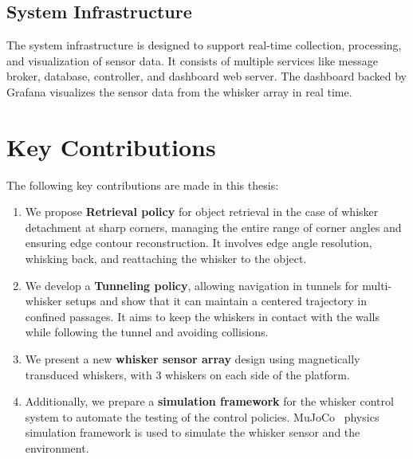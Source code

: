 \subsection{System Infrastructure}
The system infrastructure is designed to support real-time collection, processing, and visualization of sensor data.
It consists of multiple services like message broker, database, controller, and dashboard web server.
The dashboard backed by Grafana visualizes the sensor data from the whisker array in real time.


\section{Key Contributions}
The following key contributions are made in this thesis:
\begin{enumerate}
    \item We propose \textbf{Retrieval policy} for object retrieval in the case of whisker detachment at sharp corners, managing the entire range of corner angles and ensuring edge contour reconstruction.
    It involves edge angle resolution, whisking back, and reattaching the whisker to the object.
    \item We develop a \textbf{Tunneling policy}, allowing navigation in tunnels for multi-whisker setups and show that it can maintain a centered trajectory in confined passages.
    It aims to keep the whiskers in contact with the walls while following the tunnel and avoiding collisions.
    \item We present a new \textbf{whisker sensor array} design using magnetically transduced whiskers, with 3 whiskers on each side of the platform.
    \item Additionally, we prepare a \textbf{simulation framework} for the whisker control system to automate the testing of the control policies.
    MuJoCo~\cite{todorov2012mujoco} physics simulation framework is used to simulate the whisker sensor and the environment.
\end{enumerate}